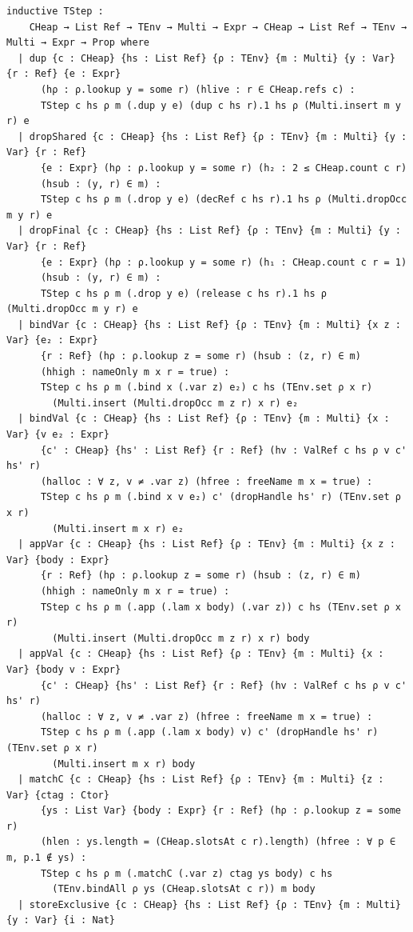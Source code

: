 \documentclass[11pt]{article}
\theoremstyle{remark}
\begin{document}
\begin{lstlisting}
inductive TStep :
    CHeap → List Ref → TEnv → Multi → Expr → CHeap → List Ref → TEnv → Multi → Expr → Prop where
  | dup {c : CHeap} {hs : List Ref} {ρ : TEnv} {m : Multi} {y : Var} {r : Ref} {e : Expr}
      (hρ : ρ.lookup y = some r) (hlive : r ∈ CHeap.refs c) :
      TStep c hs ρ m (.dup y e) (dup c hs r).1 hs ρ (Multi.insert m y r) e
  | dropShared {c : CHeap} {hs : List Ref} {ρ : TEnv} {m : Multi} {y : Var} {r : Ref}
      {e : Expr} (hρ : ρ.lookup y = some r) (h₂ : 2 ≤ CHeap.count c r)
      (hsub : (y, r) ∈ m) :
      TStep c hs ρ m (.drop y e) (decRef c hs r).1 hs ρ (Multi.dropOcc m y r) e
  | dropFinal {c : CHeap} {hs : List Ref} {ρ : TEnv} {m : Multi} {y : Var} {r : Ref}
      {e : Expr} (hρ : ρ.lookup y = some r) (h₁ : CHeap.count c r = 1)
      (hsub : (y, r) ∈ m) :
      TStep c hs ρ m (.drop y e) (release c hs r).1 hs ρ (Multi.dropOcc m y r) e
  | bindVar {c : CHeap} {hs : List Ref} {ρ : TEnv} {m : Multi} {x z : Var} {e₂ : Expr}
      {r : Ref} (hρ : ρ.lookup z = some r) (hsub : (z, r) ∈ m)
      (hhigh : nameOnly m x r = true) :
      TStep c hs ρ m (.bind x (.var z) e₂) c hs (TEnv.set ρ x r)
        (Multi.insert (Multi.dropOcc m z r) x r) e₂
  | bindVal {c : CHeap} {hs : List Ref} {ρ : TEnv} {m : Multi} {x : Var} {v e₂ : Expr}
      {c' : CHeap} {hs' : List Ref} {r : Ref} (hv : ValRef c hs ρ v c' hs' r)
      (halloc : ∀ z, v ≠ .var z) (hfree : freeName m x = true) :
      TStep c hs ρ m (.bind x v e₂) c' (dropHandle hs' r) (TEnv.set ρ x r)
        (Multi.insert m x r) e₂
  | appVar {c : CHeap} {hs : List Ref} {ρ : TEnv} {m : Multi} {x z : Var} {body : Expr}
      {r : Ref} (hρ : ρ.lookup z = some r) (hsub : (z, r) ∈ m)
      (hhigh : nameOnly m x r = true) :
      TStep c hs ρ m (.app (.lam x body) (.var z)) c hs (TEnv.set ρ x r)
        (Multi.insert (Multi.dropOcc m z r) x r) body
  | appVal {c : CHeap} {hs : List Ref} {ρ : TEnv} {m : Multi} {x : Var} {body v : Expr}
      {c' : CHeap} {hs' : List Ref} {r : Ref} (hv : ValRef c hs ρ v c' hs' r)
      (halloc : ∀ z, v ≠ .var z) (hfree : freeName m x = true) :
      TStep c hs ρ m (.app (.lam x body) v) c' (dropHandle hs' r) (TEnv.set ρ x r)
        (Multi.insert m x r) body
  | matchC {c : CHeap} {hs : List Ref} {ρ : TEnv} {m : Multi} {z : Var} {ctag : Ctor}
      {ys : List Var} {body : Expr} {r : Ref} (hρ : ρ.lookup z = some r)
      (hlen : ys.length = (CHeap.slotsAt c r).length) (hfree : ∀ p ∈ m, p.1 ∉ ys) :
      TStep c hs ρ m (.matchC (.var z) ctag ys body) c hs
        (TEnv.bindAll ρ ys (CHeap.slotsAt c r)) m body
  | storeExclusive {c : CHeap} {hs : List Ref} {ρ : TEnv} {m : Multi} {y : Var} {i : Nat}

\end{lstlisting}
\end{document}
